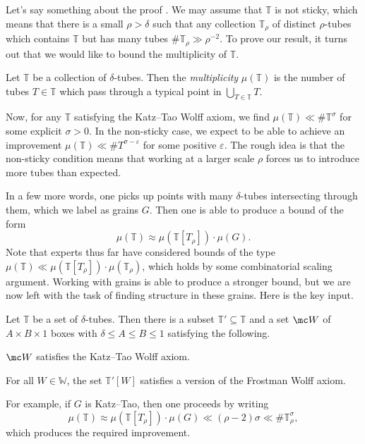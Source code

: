 \documentclass{article}
\begin{document}
Let's say something about the proof . We may assume that $\mathbb T$ is not sticky, which means that there is a small $\rho>\delta$ such that any collection $\mathbb T_\rho$ of distinct $\rho$-tubes which contains $\mathbb T$ but has many tubes $\#\mathbb T_\rho\gg\rho^{-2}$. To prove our result, it turns out that we would like to bound the multiplicity of $\mathbb T$.
\begin{definition}[multiplicity]
	Let $\mathbb T$ be a collection of $\delta$-tubes. Then the \textit{multiplicity} $\mu(\mathbb T)$ is the number of tubes $T\in\mathbb T$ which pass through a typical point in $\bigcup_{T\in\mathbb T}T$.
\end{definition}
Now, for any $\mathbb T$ satisfying the Katz--Tao Wolff axiom, we find $\mu(\mathbb T)\ll\#\mathbb T^\sigma$ for some explicit $\sigma>0$. In the non-sticky case, we expect to be able to achieve an improvement $\mu(\mathbb T)\ll\#T^{\sigma-\varepsilon}$ for some positive $\varepsilon$. The rough idea is that the non-sticky condition means that working at a larger scale $\rho$ forces us to introduce more tubes than expected.

In a few more words, one picks up points with many $\delta$-tubes intersecting through them, which we label as grains $G$. Then one is able to produce a bound of the form
\[\mu(\mathbb T)\approx\mu(\mathbb T[T_\rho])\cdot\mu(G).\]
Note that experts thus far have considered bounds of the type $\mu(\mathbb T)\ll\mu(\mathbb T[T_\rho])\cdot\mu(\mathbb T_\rho)$, which holds by some combinatorial scaling argument. Working with grains is able to produce a stronger bound, but we are now left with the task of finding structure in these grains. Here is the key input.
\begin{proposition}
	Let $\mathbb T$ be a set of $\delta$-tubes. Then there is a subset $\mathbb T'\subseteq\mathbb T$ and a set $\mc W$ of $A\times B\times1$ boxes with $\delta\le A\le B\le1$ satisfying the following.
	\begin{listroman}
		\item $\mc W$ satisfies the Katz--Tao Wolff axiom.
		\item For all $W\in\mathbb W$, the set $\mathbb T'[W]$ satisfies a version of the Frostman Wolff axiom. 
	\end{listroman}
\end{proposition}
For example, if $G$ is Katz--Tao, then one proceeds by writing
\[\mu(\mathbb T)\approx\mu(\mathbb T[T_\rho])\cdot\mu(G)\ll(\rho-2)\sigma\ll\#\mathbb T_\rho^\sigma,\]
which produces the required improvement.
\end{document}
